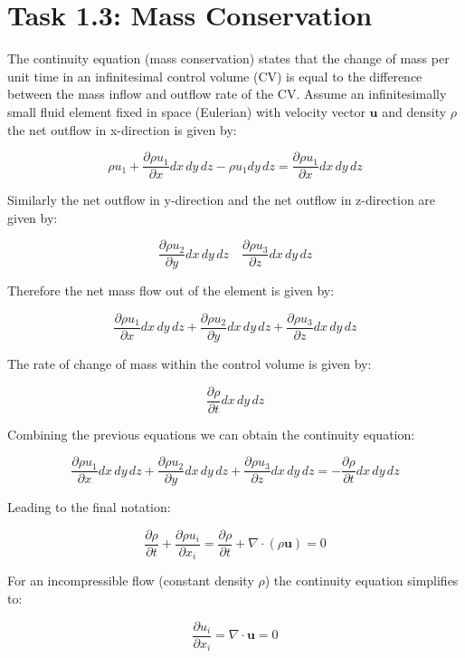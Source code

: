 \documentclass{article}
\begin{document}
\small


\section*{Task 1.3: Mass Conservation}

The continuity equation (mass conservation) states that the change of mass per unit time in an infinitesimal control volume (CV) is equal to the difference between the mass inflow and outflow rate of the CV. Assume an infinitesimally small fluid element fixed in space (Eulerian) with velocity vector $\mathbf{u}$ and density $\rho$ the net outflow in x-direction is given by:

\begin{equation}
\rho u_1 + \frac{\partial \rho u_1}{\partial x} dx \, dy \, dz - \rho u_1 dy \, dz = \frac{\partial \rho u_1}{\partial x} dx \, dy \, dz
\end{equation}

Similarly the net outflow in y-direction and the net outflow in z-direction are given by:

\[
\frac{\partial \rho u_2}{\partial y} dx \, dy \, dz \quad \frac{\partial \rho u_3}{\partial z} dx \, dy \, dz
\]

Therefore the net mass flow out of the element is given by:

\[
\frac{\partial \rho u_1}{\partial x} dx \, dy \, dz + \frac{\partial \rho u_2}{\partial y} dx \, dy \, dz + \frac{\partial \rho u_3}{\partial z} dx \, dy \, dz
\]

The rate of change of mass within the control volume is given by:

\[
\frac{\partial \rho}{\partial t} dx \, dy \, dz
\]

Combining the previous equations we can obtain the continuity equation:

\[
\frac{\partial \rho u_1}{\partial x} dx \, dy \, dz + \frac{\partial \rho u_2}{\partial y} dx \, dy \, dz + \frac{\partial \rho u_3}{\partial z} dx \, dy \, dz = - \frac{\partial \rho}{\partial t} dx \, dy \, dz
\]

Leading to the final notation:

\[
\frac{\partial \rho}{\partial t} + \frac{\partial \rho u_i}{\partial x_i} = \frac{\partial \rho}{\partial t} + \nabla \cdot (\rho \mathbf{u}) = 0
\]

For an incompressible flow (constant density $\rho$) the continuity equation simplifies to:

\[
\frac{\partial u_i}{\partial x_i} = \nabla \cdot \mathbf{u} = 0
\]
\end{document}
